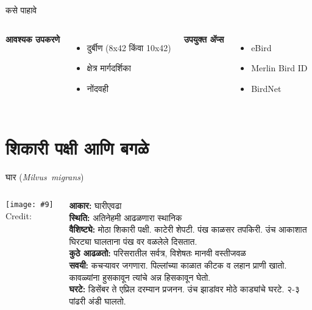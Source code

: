 \documentclass[aspectratio=169]{beamer}
\newcommand{\imagecredit}[1]{%
  \def\stripext##1.jpg{##1}%
  \edef\creditfile{\stripext#1_credit.txt}%
  {\scriptsize\latintext Credit: }%
}
\newcommand{\sciname}[1]{\mbox{\latintext\textit{#1}}}
\begin{document}
\begin{frame}{कसे पाहावे}
    \begin{columns}[T]
        \textbf{आवश्यक उपकरणे}
        \begin{itemize}
            \item दुर्बीण ({\latintext 8x42} किंवा {\latintext 10x42})
            \item क्षेत्र मार्गदर्शिका
            \item नोंदवही
        \end{itemize}
        \textbf{उपयुक्त ॲप्स}
        \begin{itemize}
            \item {\latintext eBird}
            \item {\latintext Merlin Bird ID}
            \item {\latintext BirdNet}
        \end{itemize}
    \end{columns}
\end{frame}

\newcommand{\birdslide}[9]{%
\begin{frame}{#1 (\sciname{#2})}
    \begin{columns}[T]
        \column{0.5\textwidth}
        \texttt{[image: \#9]}
        \imagecredit{#9}
        \column{0.5\textwidth}
        \textbf{आकार:} #3 \\
        \textbf{स्थिति:} #4 \\[0.5em]
        \textbf{वैशिष्ट्ये:} #5 \\[0.5em]
        \textbf{कुठे आढळतो:} #6 \\[0.5em]
        \textbf{सवयी:} #7 \\[0.5em]
        \textbf{घरटे:} #8
    \end{columns}
\end{frame}
}

\section{शिकारी पक्षी आणि बगळे}
\birdslide{घार}{Milvus migrans}
{घारीएवढा}
{अतिनेहमी आढळणारा स्थानिक}
{मोठा शिकारी पक्षी. काटेरी शेपटी. पंख काळसर तपकिरी. उंच आकाशात घिरट्या घालताना पंख वर वळलेले दिसतात.}
{परिसरातील सर्वत्र, विशेषतः मानवी वस्तीजवळ}
{कचऱ्यावर जगणारा. पिल्लांच्या काळात कीटक व लहान प्राणी खातो. कावळ्यांना हुसकावून त्यांचे अन्न हिसकावून घेतो.}
{डिसेंबर ते एप्रिल दरम्यान प्रजनन. उंच झाडांवर मोठे काड्यांचे घरटे. २-३ पांढरी अंडी घालतो.}
{black-kite.jpg}
\end{document}
